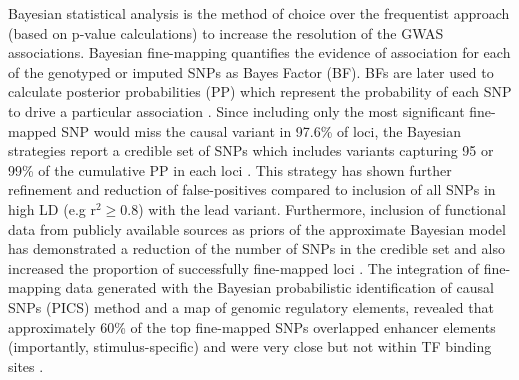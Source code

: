 Bayesian statistical analysis is the method of choice over the frequentist approach (based on p-value calculations) to increase the resolution of the GWAS associations. Bayesian fine-mapping quantifies the evidence of association for each of the genotyped or imputed SNPs as Bayes Factor (BF). BFs are later used to calculate posterior probabilities (PP) which represent the probability of each SNP to drive a particular association \parencite{Wakefield2007}. Since including only the most significant fine-mapped SNP would miss the causal variant in 97.6\% of loci, the Bayesian strategies report a credible set of SNPs which includes variants capturing 95 or 99\% of the cumulative PP in each loci \parencite{Bunt2015}. This strategy has shown further refinement and reduction of false-positives compared to inclusion of all SNPs in high LD (e.g r$^2\geq$0.8) with the lead variant\parencite{Bunt2015}. Furthermore, inclusion of functional data from publicly available sources as priors of the approximate Bayesian model has demonstrated a reduction of the number of SNPs in the credible set and also increased the proportion of successfully fine-mapped loci \parencite{Bunt2015, Kichaev2015}. The integration of fine-mapping data generated with the Bayesian probabilistic identification of causal SNPs (PICS) method and a map of genomic regulatory elements, revealed that approximately 60\% of the top fine-mapped SNPs overlapped enhancer elements (importantly, stimulus-specific) and were very close but not within TF binding sites \parencite{Farh2015}. 



